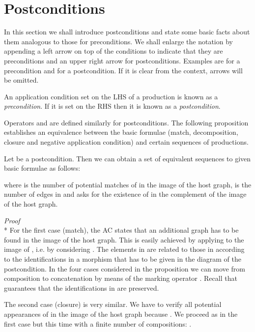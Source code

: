 \documentclass{fundam}
\begin{document}
\section{Postconditions}
\label{sec:postconditions}


In this section we shall introduce postconditions and state some basic
facts about them analogous to those for preconditions. We shall
enlarge the notation by appending a left arrow on top of the
conditions to indicate that they are preconditions and an upper
right arrow for postconditions.  Examples are
 for a precondition and
 for a postcondition.  If it is clear
from the context, arrows will be omitted.

\begin{definition}
  \label{def:prePostCondition}
  An application condition set on the LHS of a production is known as
  a \emph{precondition}. If it is set on the RHS then it is known as a
  \emph{postcondition}.
\end{definition}

Operators  and
 are defined similarly for
postconditions. The following proposition establishes an
equivalence between the basic formulae (match, decomposition, closure
and negative application condition) and certain sequences of
productions.

\begin{proposition}
  \label{prop:postConds}
  Let  be a postcondition. Then we can
  obtain a set of equivalent sequences to given basic formulae as
  follows:
  
  where  is the number of potential matches of  in the image of
  the host graph,  is the number of edges in  and
   asks for the existence of  in the complement of
  the image of the host graph.
\end{proposition}

\noindent \emph{Proof} \\*
 For the first case (match), the AC states that an additional
graph  has to be found in the image of the host graph. This is
easily achieved by applying  to the image of , i.e. by
considering . The elements in  are related to those in  according to the
identifications in a morphism  that has to be given in the diagram
of the postcondition. In the four cases considered in the proposition
we can move from composition to concatenation by means of the marking
operator . Recall that  guarantees that the
identifications in  are preserved.

The second case (closure) is very similar. We have to verify all
potential appearances of  in the image of the host graph because
. We proceed as in the
first case but this time with a finite number of compositions: .
\end{document}
